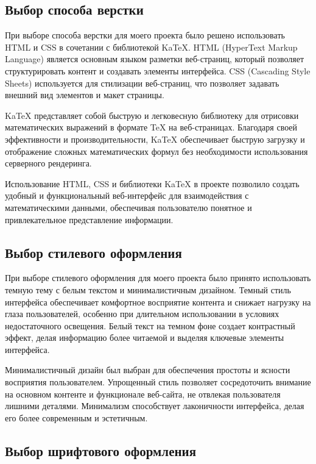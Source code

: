 \documentclass{article}
\begin{document}
    \subsection{Выбор способа верстки}

    При выборе способа верстки для моего проекта было решено использовать HTML и CSS в сочетании с библиотекой KaTeX. HTML (HyperText Markup Language) является основным языком разметки веб-страниц, который позволяет структурировать контент и создавать элементы интерфейса. CSS (Cascading Style Sheets) используется для стилизации веб-страниц, что позволяет задавать внешний вид элементов и макет страницы.

    KaTeX представляет собой быструю и легковесную библиотеку для отрисовки математических выражений в формате TeX на веб-страницах. Благодаря своей эффективности и производительности, KaTeX обеспечивает быструю загрузку и отображение сложных математических формул без необходимости использования серверного рендеринга.

    Использование HTML, CSS и библиотеки KaTeX в проекте позволило создать удобный и функциональный веб-интерфейс для взаимодействия с математическими данными, обеспечивая пользователю понятное и привлекательное представление информации.


    \subsection{Выбор стилевого оформления}

    При выборе стилевого оформления для моего проекта было принято использовать темную тему с белым текстом и минималистичным дизайном. Темный стиль интерфейса обеспечивает комфортное восприятие контента и снижает нагрузку на глаза пользователей, особенно при длительном использовании в условиях недостаточного освещения. Белый текст на темном фоне создает контрастный эффект, делая информацию более читаемой и выделяя ключевые элементы интерфейса.

    Минималистичный дизайн был выбран для обеспечения простоты и ясности восприятия пользователем. Упрощенный стиль позволяет сосредоточить внимание на основном контенте и функционале веб-сайта, не отвлекая пользователя лишними деталями. Минимализм способствует лаконичности интерфейса, делая его более современным и эстетичным.


    \subsection{Выбор шрифтового оформления}
\end{document}
